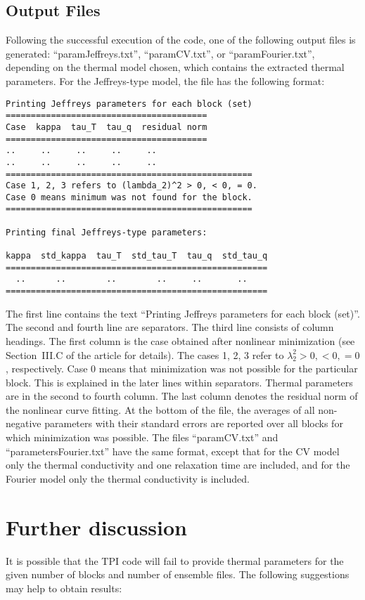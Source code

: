 \documentclass[11pt]{article}
\newcommand{\tpicode}{TPI code\xspace}
\numberwithin{equation}{section}
\begin{document}
\subsection{Output Files}
Following the successful execution of the code, one of the following output files is generated:
``paramJeffreys.txt'', ``paramCV.txt'', or ``paramFourier.txt'', depending
on the thermal model chosen, which contains the extracted thermal parameters.
For the Jeffreys-type model, the file has the following format:
\begin{verbatim}
Printing Jeffreys parameters for each block (set)
========================================
Case  kappa  tau_T  tau_q  residual norm
========================================
..     ..     ..     ..     ..
..     ..     ..     ..     ..
=================================================
Case 1, 2, 3 refers to (lambda_2)^2 > 0, < 0, = 0.
Case 0 means minimum was not found for the block.
=================================================

Printing final Jeffreys-type parameters:

kappa  std_kappa  tau_T  std_tau_T  tau_q  std_tau_q
====================================================
  ..      ..        ..        ..     ..       ..    
====================================================
\end{verbatim}
The first line contains the text ``Printing Jeffreys parameters for each block
(set)''. The second and fourth line are separators. The third line consists of
column headings. The first column is the case obtained after nonlinear
minimization (see Section~III.C of the article for details). The cases 1, 2, 3
refer to $\lambda_2^2 > 0, < 0, = 0$, respectively. Case 0 means that
minimization was not possible for the particular block. This is explained in the
later lines within separators. Thermal parameters are in the second to fourth
column. The last column denotes the residual norm of the nonlinear curve fitting.
At the bottom of the file, the averages of all non-negative parameters with
their standard errors are reported over all blocks for which minimization was
possible. The files ``paramCV.txt'' and ``parametersFourier.txt'' have the same
format, except that for the CV model only the thermal conductivity and one relaxation time
are included, and for the Fourier model only the thermal conductivity is included.

\section{Further discussion}
It is possible that the \tpicode will fail to provide thermal parameters for the
given number of blocks and number of ensemble files. The following suggestions
may help to obtain results:
\end{document}
